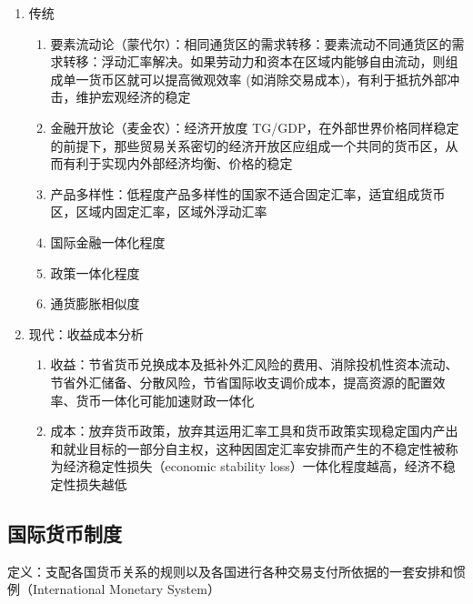 \documentclass[12pt]{book}
\begin{document}
\begin{enumerate}[1.]
    \item 传统
          \begin{enumerate}[(1)]
              \item 要素流动论（蒙代尔）：相同通货区的需求转移：要素流动不同通货区的需求转移：浮动汇率解决。如果劳动力和资本在区域内能够自由流动，则组成单一货币区就可以提高微观效率 (如消除交易成本)，有利于抵抗外部冲击，维护宏观经济的稳定
              \item 金融开放论（麦金农）：经济开放度 TG/GDP，在外部世界价格同样稳定的前提下，那些贸易关系密切的经济开放区应组成一个共同的货币区，从而有利于实现内外部经济均衡、价格的稳定
              \item 产品多样性：低程度产品多样性的国家不适合固定汇率，适宜组成货币区，区域内固定汇率，区域外浮动汇率
              \item 国际金融一体化程度
              \item 政策一体化程度
              \item 通货膨胀相似度
          \end{enumerate}
    \item 现代：收益成本分析
          \begin{enumerate}[(1)]
              \item 收益：节省货币兑换成本及抵补外汇风险的费用、消除投机性资本流动、节省外汇储备、分散风险，节省国际收支调价成本，提高资源的配置效率、货币一体化可能加速财政一体化
              \item 成本：放弃货币政策，放弃其运用汇率工具和货币政策实现稳定国内产出和就业目标的一部分自主权，这种因固定汇率安排而产生的不稳定性被称为经济稳定性损失（economic stability loss）一体化程度越高，经济不稳定性损失越低
          \end{enumerate}
\end{enumerate}


\subsection{国际货币制度}

定义：支配各国货币关系的规则以及各国进行各种交易支付所依据的一套安排和惯例（International Monetary System）

\end{document}

